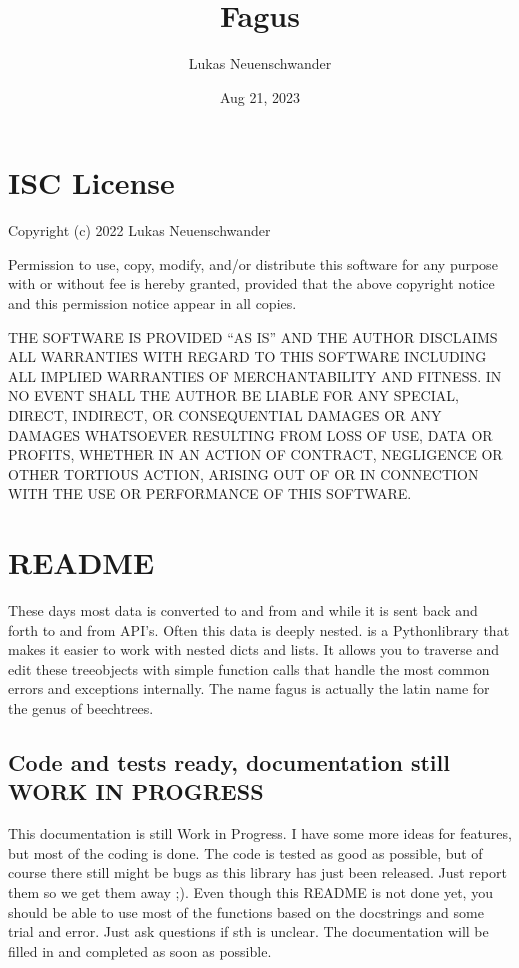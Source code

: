 \documentclass[a4paper,10pt,english]{sphinxmanual}
\title{Fagus}
\date{Aug 21, 2023}
\author{Lukas Neuenschwander}
\begin{document}
\pagestyle{empty}
\sphinxmaketitle
\pagestyle{plain}
\sphinxtableofcontents
\pagestyle{normal}
\label{\detokenize{index::doc}}


\sphinxstepscope


\chapter{ISC License}
\label{\detokenize{LICENSE:isc-license}}\label{\detokenize{LICENSE::doc}}
\sphinxAtStartPar
Copyright (c) 2022 Lukas Neuenschwander

\sphinxAtStartPar
Permission to use, copy, modify, and/or distribute this software for any purpose with or without fee is hereby granted, provided that the above copyright notice and this permission notice appear in all copies.

\sphinxAtStartPar
THE SOFTWARE IS PROVIDED “AS IS” AND THE AUTHOR DISCLAIMS ALL WARRANTIES WITH REGARD TO THIS SOFTWARE INCLUDING ALL IMPLIED WARRANTIES OF MERCHANTABILITY AND FITNESS. IN NO EVENT SHALL THE AUTHOR BE LIABLE FOR ANY SPECIAL, DIRECT, INDIRECT, OR CONSEQUENTIAL DAMAGES OR ANY DAMAGES WHATSOEVER RESULTING FROM LOSS OF USE, DATA OR PROFITS, WHETHER IN AN ACTION OF CONTRACT, NEGLIGENCE OR OTHER TORTIOUS ACTION, ARISING OUT OF OR IN CONNECTION WITH THE USE OR PERFORMANCE OF THIS SOFTWARE.

\sphinxstepscope


\chapter{README}
\label{\detokenize{README:readme}}\label{\detokenize{README::doc}}
\sphinxAtStartPar
These days most data is converted to and from  and  while it is sent back and forth to and from API’s. Often this data is deeply nested.  is a Python\sphinxhyphen{}library that makes it easier to work with nested dicts and lists. It allows you to traverse and edit these tree\sphinxhyphen{}objects with simple function calls that handle the most common errors and exceptions internally. The name fagus is actually the latin name for the genus of beech\sphinxhyphen{}trees.


\section{Code and tests ready, documentation still WORK IN PROGRESS}
\label{\detokenize{README:code-and-tests-ready-documentation-still-work-in-progress}}
\sphinxAtStartPar
This documentation is still Work in Progress. I have some more ideas for features, but most of the coding is done. The code is tested as good as possible, but of course there still might be bugs as this library has just been released. Just report them so we get them away ;). Even though this README is not done yet, you should be able to use most of the functions based on the docstrings and some trial and error. Just ask questions  if sth is unclear. The documentation will be filled in and completed as soon as possible.
\end{document}
